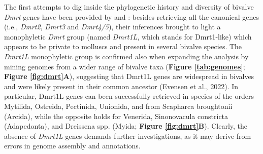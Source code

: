 \documentclass[../main.tex]{subfiles}
\begin{document}
The first attempts to dig inside the phylogenetic history and diversity of bivalve \textit{Dmrt} genes have been provided by \textbf{\cite{li2018foxl2}} and \textbf{\cite{evensen2022comparative}}: besides retrieving all the canonical genes (i.e., \textit{Dmrt2}, \textit{Dmrt3} and \textit{Dmrt4/5}), their inferences brought to light a monophyletic \textit{Dmrt} group (named \textit{Dmrt1L}, which stands for Dmrt1-like) which appears to be private to molluscs and present in several bivalve species. The \textit{Dmrt1L} monophyletic group is confirmed also when expanding the analysis by mining genomes from a wider range of bivalve taxa (\textbf{Figure \ref{tab:genomes}}; \textbf{Figure \ref{fig:dmrt}A}), suggesting that Dmrt1L genes are widespread in bivalves and were likely present in their common ancestor (Evensen et al., 2022). In particular, Dmrt1L genes can been successfully retrieved in species of the orders Mytilida, Ostreida, Pectinida, Unionida, and from Scapharca broughtonii (Arcida), while the opposite holds for Venerida, Sinonovacula constricta (Adapedonta), and Dreissena spp. (Myida; \textbf{Figure \ref{fig:dmrt}B}). Clearly, the absence of \textit{Dmrt1L} genes demands further investigations, as it may derive from errors in genome assembly and annotations.
\end{document}
